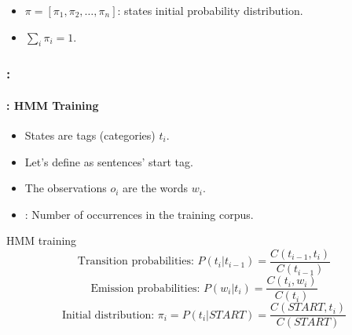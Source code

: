 \documentclass[xcolor=table]{beamer}
\begin{document}
\begin{frame}
\begin{minipage}{.45\textwidth}
		\end{minipage}
	
	\begin{itemize}
			\item $\pi = [\pi_1, \pi_2, \ldots, \pi_n ]$: states initial probability distribution.
			\item $\sum_i \pi_i = 1$.
		\end{itemize}
	
\end{frame}

\begin{frame}
	\frametitle{\insertshortsubtitle: \insertsection}
	\framesubtitle{\insertsubsection: HMM Training}
	
	\begin{itemize}
			\item States are tags (categories) $t_i$.
			\item Let's define  as sentences' start tag.
			\item The observations $o_i$ are the words $w_i$.
			\item {}: Number of occurrences in the training corpus.
		\end{itemize}
	
	\begin{block}{HMM training}
			\[
			\text{Transition probabilities: } P(t_i | t_{i-1}) = \frac{C(t_{i-1}, t_i)}{C(t_{i-1})} 
			\]\[
			\text{Emission probabilities: } P(w_i | t_i) = \frac{C(t_i, w_i)}{C(t_i)}
			\]\[
			\text{Initial distribution: } \pi_i = P(t_i | START) = \frac{C(START, t_i)}{C(START)}
			\]
		\end{block}
\end{frame}
\end{document}
